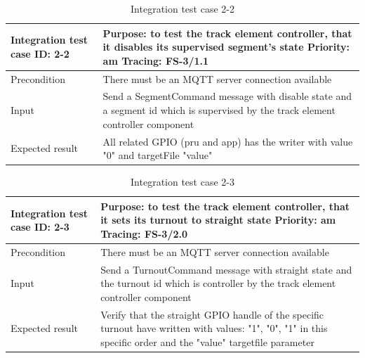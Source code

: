 \begin{table}[H]
	\caption{Integration test case 2-2}
	\label{table:TCase-FSI2-2}
	\begin{center}
		\renewcommand{\arraystretch}{1.8}
		\begin{tabu} 
			to 0.9 \textwidth
			{  X[0.3, l] X[l] }
			\toprule
			Integration test case ID: 2-2 & Purpose: to test the track element controller, that it disables its supervised segment's state  \newline Priority: am \newline Tracing: FS-3/1.1 \\ \midrule
			Precondition                  & There must be an MQTT server connection available                                                                                                \\
			Input                         & Send a SegmentCommand message with disable state and a segment id which is supervised by the track element controller component                  \\
			Expected result               & All related GPIO (pru and app) has the writer with value "0" and targetFile "value"                                                              \\ \bottomrule
		\end{tabu}
	\end{center}
\end{table} 

\begin{table}[H]
	\caption{Integration test case 2-3}
	\label{table:TCase-FSI2-3}
	\begin{center}
		\renewcommand{\arraystretch}{1.8}
		\begin{tabu} 
			to 0.9 \textwidth
			{  X[0.3, l] X[l] }
			\toprule
			Integration test case ID: 2-3 & Purpose: to test the track element controller, that it sets its turnout to straight state     \newline Priority: am \newline Tracing: FS-3/2.0                   \\ \midrule
			Precondition                  & There must be an MQTT server connection available                                                                                                                \\
			Input                         & Send a TurnoutCommand message with straight state and the turnout id which is controller by the track element controller component                               \\
			Expected result               & Verify that the straight GPIO handle of the specific turnout have written with values: "1", "0", "1" in this specific order and the "value" targetfile parameter \\ \bottomrule
		\end{tabu}
	\end{center}
\end{table} 

